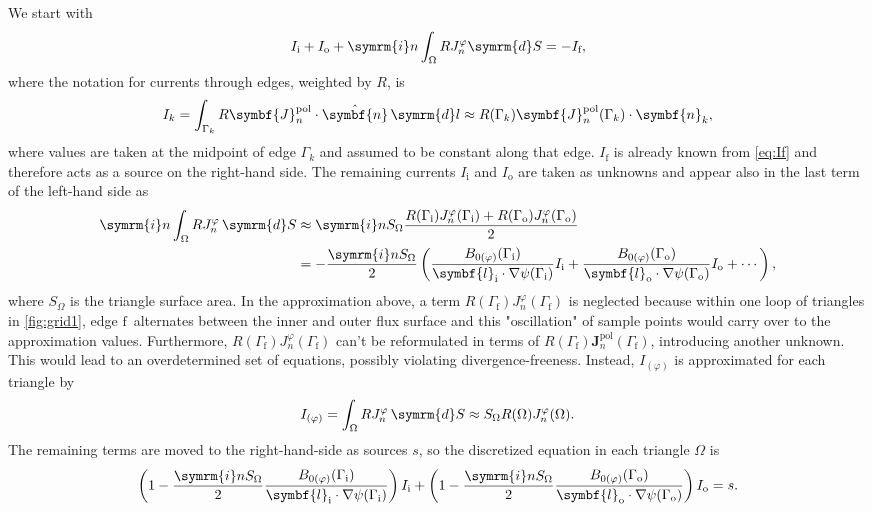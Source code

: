 \documentclass[a4paper, twoside, 10pt, english]{article}
\numberwithin{equation}{section}
\let\temp\varrho
\let\varrho\rho
\let\rho\temp
\let\temp\vartheta
\let\vartheta\theta
\let\theta\temp
\let\temp\varphi
\let\varphi\phi
\let\phi\temp
\let\vec\symbf
\newcommand*\grad{\ensuremath{\nabla}}
\newcommand*\diff{\ensuremath{\symrm{d}}}  %
\newcommand*\im{\ensuremath{\symrm{i}}}  %
\newcommand*\pol{\ensuremath{\textrm{pol}}}  %
\newcommand*\fs{\ensuremath{\textrm{f}}}  %
\newcommand*\inw{\ensuremath{\textrm{i}}}  %
\newcommand*\out{\ensuremath{\textrm{o}}}  %
\begin{document}
We start with
\begin{gather}
  I_{\inw} + I_{\out} + \im n \int_{\Omega} R J_{n}^{\phi} \diff S = -I_{\fs},
\end{gather}
where the notation for currents through edges, weighted by $R$, is
\begin{gather}
  I_{k} = \int_{\Gamma_{k}} R \vec{J}_{n}^{\pol} \cdot \hat{\vec{n}} \, \diff l \approx R (\Gamma_{k}) \vec{J}_{n}^{\pol} (\Gamma_{k}) \cdot \vec{n}_{k},
\end{gather}
where values are taken at the midpoint of edge $\Gamma_{k}$ and assumed to be constant along that edge. $I_{\fs}$ is already known from \cref{eq:If} and therefore acts as a source on the right-hand side. The remaining currents $I_{\inw}$ and $I_{\out}$ are taken as unknowns and appear also in the last term of the left-hand side as
\begin{align}
  \im n \int_{\Omega} R J_{n}^{\phi} \, \diff S & \approx \im n S_{\Omega} \frac{R (\Gamma_{\inw}) J_{n}^{\phi} (\Gamma_{\inw}) + R (\Gamma_{\out}) J_{n}^{\phi} (\Gamma_{\out})}{2} \nonumber \\
  &= -\frac{\im n S_{\Omega}}{2} \left( \frac{B_{0 (\phi)} (\Gamma_{\inw})}{\vec{l}_{\inw} \cdot \grad \psi (\Gamma_{\inw})} I_{\inw} + \frac{B_{0 (\phi)} (\Gamma_{\out})}{\vec{l}_{\out} \cdot \grad \psi (\Gamma_{\out})} I_{\out} + \dotsb \right),
\end{align}
where $S_{\Omega}$ is the triangle surface area. In the approximation above, a term $R (\Gamma_{\fs}) J_{n}^{\phi} (\Gamma_{\fs})$ is neglected because within one loop of triangles in \cref{fig:grid1}, edge \fs\ alternates between the inner and outer flux surface and this "oscillation" of sample points would carry over to the approximation values. Furthermore, $R (\Gamma_{\fs}) J_{n}^{\phi} (\Gamma_{\fs})$ can't be reformulated in terms of $R (\Gamma_{\fs}) \vec{J}_{n}^{\pol} (\Gamma_{\fs})$, introducing another unknown. This would lead to an overdetermined set of equations, possibly violating divergence-freeness. Instead, $I_{(\phi)}$ is approximated for each triangle by
\begin{gather}
  I_{(\phi)} = \int_{\Omega} R J_{n}^{\phi} \, \diff S \approx S_{\Omega} R (\Omega) J_{n}^{\phi} (\Omega).
\end{gather}
The remaining terms are moved to the right-hand-side as sources $s$, so the discretized equation in each triangle $\Omega$ is
\begin{gather}
  \left( 1 - \frac{\im n S_{\Omega}}{2} \frac{B_{0 (\phi)} (\Gamma_{\inw})}{\vec{l}_{\inw} \cdot \grad \psi (\Gamma_{\inw})} \right) I_{\inw} + \left( 1 - \frac{\im n S_{\Omega}}{2} \frac{B_{0 (\phi)} (\Gamma_{\out})}{\vec{l}_{\out} \cdot \grad \psi (\Gamma_{\out})} \right) I_{\out} = s. \label{eq:Ii-Io}
\end{gather}
\end{document}
